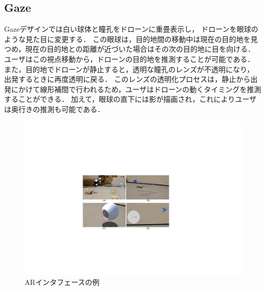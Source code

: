 \documentclass[a4paper,10pt,twocolumn,uplatex]{jsarticle}
\begin{document}
\subsection{Gaze}
Gazeデザインでは白い球体と瞳孔をドローンに重畳表示し，
ドローンを眼球のような見た目に変更する．
この眼球は，目的地間の移動中は現在の目的地を見つめ，現在の目的地との距離が近づいた場合はその次の目的地に目を向ける．
ユーザはこの視点移動から，ドローンの目的地を推測することが可能である．
また，目的地でドローンが静止すると，透明な瞳孔のレンズが不透明になり，
出発するときに再度透明に戻る．
このレンズの透明化プロセスは，静止から出発にかけて線形補間で行われるため，ユーザはドローンの動くタイミングを推測することができる．
加えて，眼球の直下には影が描画され，これによりユーザは奥行きの推測も可能である．


\begin{figure}[!bt]
  \centering
  \includegraphics[width=\linewidth]{img/overview_hi.pdf}
  \caption{ARインタフェースの例}
  \label{fig:arinterface}
  \vspace{-3mm}
\end{figure}
\end{document}
